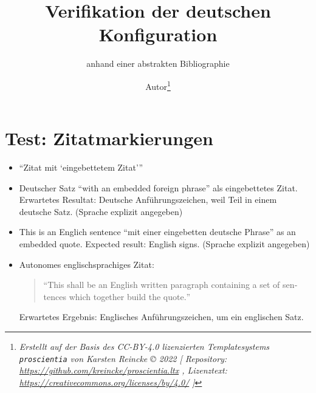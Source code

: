 \documentclass[
  DIV=calc,i
  BCOR=5mm,
  11pt,
  headings=small,
  oneside,
  abstract=true,
  toc=bib,
  english,ngerman]{scrartcl}
\begin{document}
\nocite{*}

\titlehead{Bib\LaTeX}
\subject{Release 1.0}
\title{Verifikation der deutschen Konfiguration}
\subtitle{anhand einer abstrakten Bibliographie}
\author{Autor\footnote{
\textit{Erstellt auf der Basis des CC-BY-4.0 lizenzierten Templatesystems \texttt{proscientia} von Karsten Reincke \copyright{} 2022 [
Repository: \href{https://github.com/kreincke/proscientia.ltx}{https://github.com/kreincke/proscientia.ltx} ,
Lizenztext: \href{https://creativecommons.org/licenses/by/4.0/}{https://creativecommons.org/licenses/by/4.0/} ]}}
}


\maketitle

\footnotesize
\tableofcontents

\normalsize
\section{Test: Zitatmarkierungen}
\begin{itemize}

  \item \enquote{Zitat mit \enquote{eingebettetem Zitat}}

  \item Deutscher Satz \foreignquote{german}{with an embedded foreign phrase} als eingebettetes Zitat. Erwartetes Resultat: Deutsche Anführungszeichen, weil Teil in einem deutsche Satz. (Sprache explizit angegeben)

  \item This is an Englich sentence \foreignquote{english}{mit einer eingebetten deutsche Phrase} as an embedded quote. Expected result: English signs. (Sprache explizit angegeben)

  \item Autonomes englischsprachiges Zitat:
  \begin{quote}\foreignquote{english}{This shall be an English written paragraph containing a set of sentences which together build the quote.}\end{quote}

  Erwartetes Ergebnis: Englisches Anführungszeichen, um ein englischen Satz.
\end{itemize}
\end{document}
